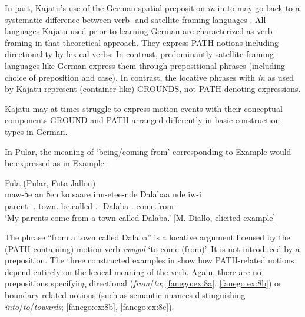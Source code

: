 \documentclass[output=paper]{langscibook}
\begin{document}
\noindent
In part, Kajatu’s use of the German spatial preposition \textit{in} in  to  may go back to a systematic difference between verb- and satellite-framing languages \citep{croft_revising_2010, talmy_semantics_1975, talmy_lexicalization_1985}. All languages Kajatu used prior to learning German are characterized as verb-framing in that theoretical approach. They express PATH notions including directionality by lexical verbs. In contrast, predominantly satellite-framing languages like German express them through prepositional phrases (including choice of preposition and case). In contrast, the locative phrases with \textit{in} as used by Kajatu represent (container-like) GROUNDS, not PATH-denoting expressions. 

Kajatu may at times struggle to express motion events with their conceptual components GROUND and PATH arranged differently in basic construction types in German. 

In Pular, the meaning of ‘being/coming from’ corresponding to Example  would be expressed as in Example :

\begin{exe}
    \ex\label{fanego:ex:7} Fula (Pular, Futa Jallon) \\
    \gll maw-ɓe an ɓen ko saare inn-etee-nde Dalabaa nde iw-i \\
    parent- \POSS \Fsg{} \Def. \Foc{} town.\NDE{} be.called-\PTCP.\PASS-\NDE{} Dalaba \Def.\NDE{} come.from-\PFV{} \\
    \glt ‘My parents come from a town called Dalaba.’ [M. Diallo, elicited example]
\end{exe}

\noindent
The phrase “from a town called Dalaba” is a locative argument licensed by the (PATH-containing) motion verb \textit{iwugol} ‘to come (from)’. It is not introduced by a preposition. The three constructed examples in  show how PATH-related notions depend entirely on the lexical meaning of the verb. Again, there are no prepositions specifying directional (\textit{from}/\textit{to}; \ref{fanego:ex:8a}, \ref{fanego:ex:8b}) or boundary-related notions (such as semantic nuances distinguishing \textit{into}/\textit{to}/\textit{towards}; \ref{fanego:ex:8b}, \ref{fanego:ex:8c}).
\newpage
\end{document}
